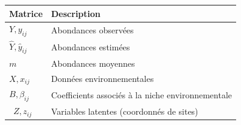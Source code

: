 \documentclass[12pt,]{article}
\begin{document}
{\small
\begin{longtable}[l]{@{}ll@{}}
\toprule
\begin{minipage}[b]{0.34\columnwidth}\raggedright
Matrice\strut
\end{minipage} & \begin{minipage}[b]{0.60\columnwidth}\raggedright
Description\strut
\end{minipage}\tabularnewline
\midrule
\endhead
\begin{minipage}[t]{0.34\columnwidth}\raggedright
\(Y, y_{ij}\)\strut
\end{minipage} & \begin{minipage}[t]{0.60\columnwidth}\raggedright
Abondances observées\strut
\end{minipage}\tabularnewline
\begin{minipage}[t]{0.34\columnwidth}\raggedright
\(\hat{Y}, \hat{y}_{ij}\)\strut
\end{minipage} & \begin{minipage}[t]{0.60\columnwidth}\raggedright
Abondances estimées\strut
\end{minipage}\tabularnewline
\begin{minipage}[t]{0.34\columnwidth}\raggedright
\(m\)\strut
\end{minipage} & \begin{minipage}[t]{0.60\columnwidth}\raggedright
Abondances moyennes\strut
\end{minipage}\tabularnewline
\begin{minipage}[t]{0.34\columnwidth}\raggedright
\(X, x_{ij}\)\strut
\end{minipage} & \begin{minipage}[t]{0.60\columnwidth}\raggedright
Données environnementales\strut
\end{minipage}\tabularnewline
\begin{minipage}[t]{0.34\columnwidth}\raggedright
\(B, \beta_{ij}\)\strut
\end{minipage} & \begin{minipage}[t]{0.60\columnwidth}\raggedright
Coefficients associés à la niche environnementale\strut
\end{minipage}\tabularnewline
\begin{minipage}[t]{0.34\columnwidth}\raggedright
~\(Z, z_{ij}\)\strut
\end{minipage} & \begin{minipage}[t]{0.60\columnwidth}\raggedright
Variables latentes (coordonnés de sites)\strut
\end{minipage}\tabularnewline

\end{longtable}}
\end{document}
